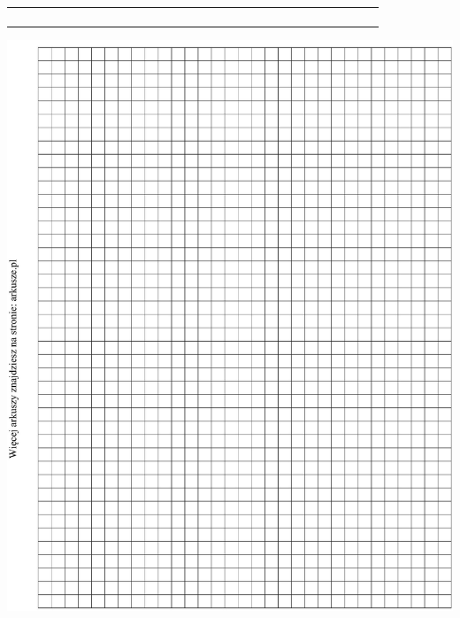 \documentclass[10pt]{article}
\begin{document}
\begin{center}
\begin{tabular}{|c|c|c|c|c|c|c|c|c|c|c|c|c|c|c|c|c|c|c|c|c|c|c|c|c|c|c|c|c|c|}
\hline
 &  &  &  &  &  &  &  &  &  &  &  &  &  &  &  &  &  &  &  &  &  &  &  &  &  &  &  &  &  \\
\hline
 &  &  &  &  &  &  &  &  &  &  &  &  &  &  &  &  &  &  &  &  &  &  &  &  &  &  &  &  &  \\
\hline
 &  &  &  &  &  &  &  &  &  &  &  &  &  &  &  &  &  &  &  &  &  &  &  &  &  &  &  &  &  \\
\hline
 &  &  &  &  &  &  &  &  &  &  &  &  &  &  &  &  &  &  &  &  &  &  &  &  &  &  &  &  &  \\
\hline
 &  &  &  &  &  &  &  &  &  &  &  &  &  &  &  &  &  &  &  &  &  &  &  &  &  &  &  &  &  \\
\hline
\end{tabular}
\end{center}

\begin{center}
\includegraphics[max width=\textwidth]{2024_11_21_f29375993e8c629c464fg-07}
\end{center}
\end{document}
